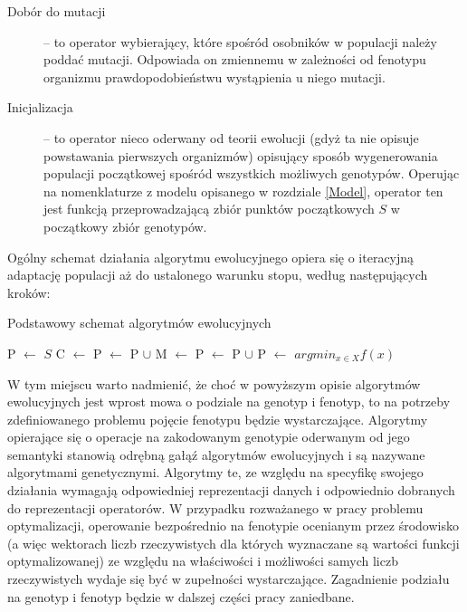 \documentclass[12pt,a4paper]{report}
\begin{document}
{{{\begin{description}
  \item[Dobór do mutacji] -- to operator wybierający, które spośród osobników w populacji należy poddać mutacji. Odpowiada on zmiennemu w zależności od fenotypu organizmu prawdopodobieństwu wystąpienia u niego mutacji.
  \item[Inicjalizacja] -- to operator nieco oderwany od teorii ewolucji (gdyż ta nie opisuje powstawania pierwszych organizmów) opisujący sposób wygenerowania populacji początkowej spośród wszystkich możliwych genotypów. Operując na nomenklaturze z modelu opisanego w rozdziale \ref{Model}, operator ten jest funkcją przeprowadzającą zbiór punktów początkowych $S$ w początkowy zbiór genotypów.
\end{description}
}
\par{
Ogólny schemat działania algorytmu ewolucyjnego opiera się o iteracyjną adaptację populacji aż do ustalonego warunku stopu, według następujących kroków:
\begin{algorithm}[H]
\caption{Podstawowy schemat algorytmów ewolucyjnych}
\label{algorithm:ea}
\begin{algorithmic}[1]
\State P $\gets$ $S$
		\State C $\gets$ 
		\State P $\gets$ P $\cup$ 
		\State M $\gets$ 
		\State P $\gets$ P $\cup$ 
		\State P $\gets$ 
	\EndWhile
    \State \Return $argmin_{x \in X} f(x)$
\EndFunction
\end{algorithmic}
\end{algorithm}
}
\par{
W tym miejscu warto nadmienić, że choć w powyższym opisie algorytmów ewolucyjnych jest wprost mowa o podziale na genotyp i fenotyp, to na potrzeby zdefiniowanego problemu pojęcie fenotypu będzie wystarczające. Algorytmy opierające się o operacje na zakodowanym genotypie oderwanym od jego semantyki stanowią odrębną gałąź algorytmów ewolucyjnych i są nazywane algorytmami genetycznymi. Algorytmy te, ze względu na specyfikę swojego działania wymagają odpowiedniej reprezentacji danych i odpowiednio dobranych do reprezentacji operatorów. W przypadku rozważanego w pracy problemu optymalizacji, operowanie bezpośrednio na fenotypie ocenianym przez środowisko (a więc wektorach liczb rzeczywistych dla których wyznaczane są wartości funkcji optymalizowanej) ze względu na właściwości i możliwości samych liczb rzeczywistych wydaje się być w zupełności wystarczające. Zagadnienie podziału na genotyp i fenotyp będzie w dalszej części pracy zaniedbane.
}
}}
\end{document}
